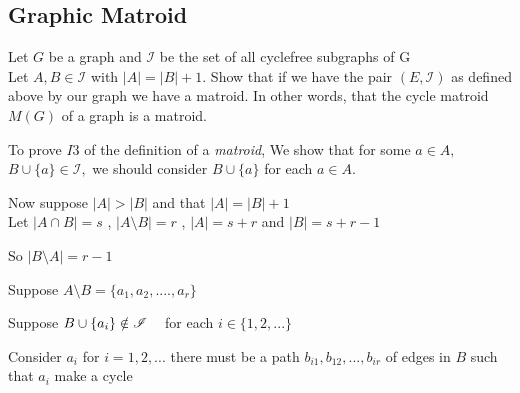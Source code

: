 \documentclass[../main.tex]{subfiles}
\begin{document}
\subsection{Graphic Matroid} 
\begin{thm}
 \noindent Let $G$ be a graph and $\mathcal{I}$ be the set of all cyclefree subgraphs of G\\
 Let $A,B \in \mathcal{I}$ with $|A|=|B|+1.$ Show that if we have the pair $(E,\mathcal{I})$ as defined above by our graph we have a matroid. In other words, that the cycle matroid $M(G)$ of a graph is a matroid.
\end{thm} 
 \vspace{3mm}
 
 \noindent To prove $ I3 $ of the definition of a \textit{matroid}, We show that for some $a \in A ,$\\$ B \cup \{a\} \in \mathcal{I},$  we should consider $B \cup \{a\}$ for each $a \in A.$ 
 
 \vspace{3mm}
 
 \noindent\Proof
 
 \noindent Now suppose $ |A|  >  |B| $ and that $|A|  =  |B| + 1$\\
 Let 
 $ |A \cap B| = s $ , $ |A \setminus B| = r$ ,
 $ |A| = s + r $ and $ |B| = s + r - 1$ 
 
\noindent So $ |B \setminus A| = r - 1$
 
 \vspace{3mm}
 
 \noindent Suppose $ A \setminus B = \{ a_1, a_2, .... , a_r \} $ 
 
 \noindent Suppose $ B \cup \{ a_i \} \notin \mathcal{I} \hspace{3mm} $ for each $ i \in \{ 1,2,... \}$
 
 \vspace{2mm}
 
 \noindent Consider $ a_i $ for $ i = 1, 2,... $ there must be a path $ b_{i1}, b_{12}, ... , b_{ir} $ of edges in $B$ such that $ a_i $ make a cycle
  
 \vspace{2mm}
 
 \begin{minipage}{.2\textwidth}
 \end{minipage}
\hspace{4cm} \begin{minipage}{.2\textwidth}
 \end{minipage}
 
\end{document}
